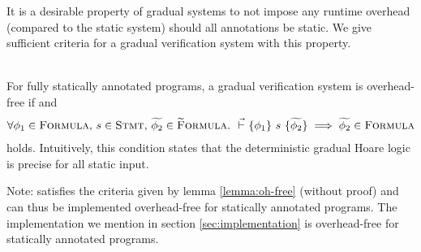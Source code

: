 It is a desirable property of gradual systems to not impose any runtime overhead (compared to the static system) should all annotations be static.
We give sufficient criteria for a gradual verification system with this property.
\begin{lemma}
    \label{lemma:oh-free}~\\
    For fully statically annotated programs, a gradual verification system is overhead-free if  and
    \begin{align}
    \label{lemma-frm:oh-free}
    \forall \phi_1 \in \textup{\textsc{Formula}},\, s \in \textup{\textsc{Stmt}},\, \widetilde{\phi_2} \in \textup{\textsc{\ensuremath{\widetilde{\text{F}}}ormula}}.~ {} \,\,\vec{\vdash}\,\, \{{\phi_1}\} ~{s}~ \{{\widetilde{\phi_2}}\} \implies \widetilde{\phi_2} \in \textup{\textsc{Formula}}
    \end{align}
    holds.
    Intuitively, this condition states that the deterministic gradual Hoare logic is precise for all static input.
    
\end{lemma}

Note: \gvlidf satisfies the criteria given by lemma \ref{lemma:oh-free} (without proof) and can thus be implemented overhead-free for statically annotated programs.
The implementation we mention in section \ref{sec:implementation} is overhead-free for statically annotated programs.
